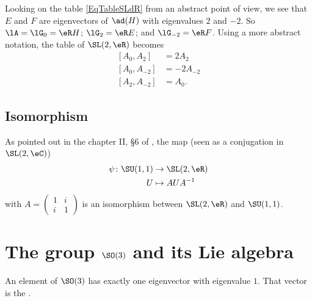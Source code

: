 Looking on the table \eqref{EqTableSLdR} from an abstract point of view, we see that $E$ and $F$ are eigenvectors of $\ad(H)$ with eigenvalues $2$ and $-2$. So $\lA=\lG_0=\eR H$; $\lG_2=\eR E$; and $\lG_{-2}=\eR F$. Using a more abstract notation, the table of $\SL(2,\eR)$ becomes
\begin{subequations}  \label{subeq_rootSLR}
\begin{align}
  [A_{0},A_{2}]&=2A_{2}\\
    [A_{0},A_{-2}]&=-2A_{-2}\\
    [A_{2},A_{-2}]&=A_{0}.
\end{align}
\end{subequations}

\subsection{Isomorphism}

As pointed out in the chapter II, \S6 of \cite{Knapp_reprez}, the map (seen as a conjugation in $\SL(2,\eC)$)
\begin{equation}
    \begin{aligned}
        \psi\colon \SU(1,1)&\to \SL(2,\eR) \\
        U&\mapsto AUA^{-1}
    \end{aligned}
\end{equation}
with $A=\begin{pmatrix}
1&i\\i&1
\end{pmatrix}$ is an isomorphism between $\SL(2,\eR)$ and $\SU(1,1)$.

                    \section{The group \texorpdfstring{$\SO(3)$}{SO3} and its Lie algebra}
\label{SubSecTheGroupSotrois}

\begin{proposition}
An element of $\SO(3)$ has exactly one eigenvector with eigenvalue $1$. That vector is the .
\end{proposition}

